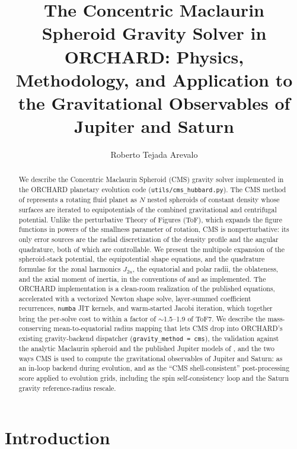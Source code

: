 \documentclass{aastex631}
\begin{document}
\title{The Concentric Maclaurin Spheroid Gravity Solver in ORCHARD:
Physics, Methodology, and Application to the Gravitational Observables of
Jupiter and Saturn}

\author{Roberto Tejada Arevalo}

\begin{abstract}
We describe the Concentric Maclaurin Spheroid (CMS) gravity solver
implemented in the ORCHARD planetary evolution code
(\texttt{utils/cms\_hubbard.py}).  The CMS method of \citet{Hubbard2013}
represents a rotating fluid planet as $N$ nested spheroids of constant
density whose surfaces are iterated to equipotentials of the combined
gravitational and centrifugal potential.  Unlike the perturbative Theory
of Figures (ToF), which expands the figure functions in powers of the
smallness parameter of rotation, CMS is nonperturbative: its only error
sources are the radial discretization of the density profile and the
angular quadrature, both of which are controllable.  We present the
multipole expansion of the spheroid-stack potential, the equipotential
shape equations, and the quadrature formulae for the zonal harmonics
$J_{2n}$, the equatorial and polar radii, the oblateness, and the axial
moment of inertia, in the conventions of \citet{Hubbard2013} and
\citet{MilitzerHubbard2024} as implemented.  The ORCHARD implementation
is a clean-room realization of the published equations, accelerated with
a vectorized Newton shape solve, layer-summed coefficient recurrences,
\texttt{numba} JIT kernels, and warm-started Jacobi iteration, which
together bring the per-solve cost to within a factor of
$\sim$1.5--1.9 of ToF7.  We describe the mass-conserving mean-to-equatorial
radius mapping that lets CMS drop into ORCHARD's existing gravity-backend
dispatcher (\texttt{gravity\_method = cms}), the validation against the
analytic Maclaurin spheroid and the published Jupiter models of
\citet{MilitzerHubbard2024}, and the two ways CMS is used to compute the
gravitational observables of Jupiter and Saturn: as an in-loop backend
during evolution, and as the ``CMS shell-consistent'' post-processing
score applied to evolution grids, including the spin self-consistency
loop and the Saturn gravity reference-radius rescale.
\end{abstract}


\section{Introduction}\label{sec:intro}
\end{document}
